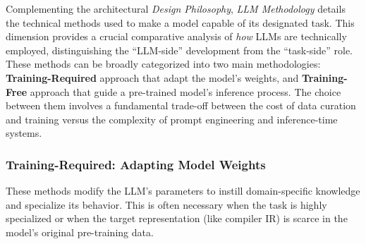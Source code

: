 \documentclass[pdflatex,sn-mathphys-ay,twocolumn, a4paper]{sn-jnl}%
\theoremstyle{thmstyleone}%
\theoremstyle{thmstyletwo}%
\theoremstyle{thmstylethree}%
\begin{document}
Complementing the architectural \textit{Design Philosophy}, \textit{LLM Methodology} details the technical methods used to make a model capable of its designated task. This dimension provides a crucial comparative analysis of \textit{how} LLMs are technically employed, distinguishing the ``LLM-side'' development from the ``task-side'' role. These methods can be broadly categorized into two main methodologies: \textbf{Training-Required} approach that adapt the model's weights, and \textbf{Training-Free} approach that guide a pre-trained model's inference process. The choice between them involves a fundamental trade-off between the cost of data curation and training versus the complexity of prompt engineering and inference-time systems.

\subsubsection{Training-Required: Adapting Model Weights}
These methods modify the LLM's parameters to instill domain-specific knowledge and specialize its behavior. This is often necessary when the task is highly specialized or when the target representation (like compiler IR) is scarce in the model's original pre-training data.
\end{document}
